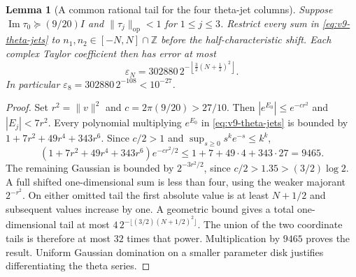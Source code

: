 \documentclass[11pt]{article}
\newtheorem{lemma}[lemma]{Lemma}
\theoremstyle{definition}
\theoremstyle{remark}
\newcommand{\Z}{\mathbb Z}
\newcommand{\op}{\mathrm{op}}
\begin{document}
\begin{lemma}[A common rational tail for the four theta-jet columns]
\label{lem:v9-jet-tail}
Suppose $\operatorname{Im}\tau_0\succeq(9/20)I$ and
$\|\tau_j\|_{\op}<1$ for $1\le j\le3$. Restrict every sum in
\cref{eq:v9-theta-jets} to $n_1,n_2\in[-N,N]\cap\Z$ before the
half-characteristic shift. Each complex Taylor coefficient then has error
at most
\begin{equation}
 \boxed{\varepsilon_N=
 302880\,2^{-\left\lfloor\frac32(N+\frac12)^2\right\rfloor}.}
 \label{eq:v9-theta-tail}
\end{equation}
In particular $\varepsilon_8=302880\,2^{-108}<10^{-27}$.
\end{lemma}
\begin{proof}
Set $r^2=\|v\|^2$ and $c=2\pi(9/20)>27/10$.
Then $|e^{E_0}|\le e^{-cr^2}$ and $|E_j|<7r^2$.
Every polynomial multiplying $e^{E_0}$ in \cref{eq:v9-theta-jets} is
bounded by $1+7r^2+49r^4+343r^6$. Since $c/2>1$ and
$\sup_{s\ge0}s^ke^{-s}\le k^k$,
\[
 (1+7r^2+49r^4+343r^6)e^{-cr^2/2}\le
 1+7+49\cdot4+343\cdot27=9465.
\]
The remaining Gaussian is bounded by $2^{-3r^2/2}$, since
$c/2>1.35>(3/2)\log2$. A full shifted one-dimensional sum is less than
four, using the weaker majorant $2^{-r^2}$. On either omitted tail the
first absolute value is at least $N+1/2$ and subsequent values increase
by one. A geometric bound gives a total one-dimensional tail at most
$4\,2^{-\lfloor(3/2)(N+1/2)^2\rfloor}$. The union of the two
coordinate tails is therefore at most $32$ times that power. Multiplication
by $9465$ proves the result. Uniform Gaussian domination on a smaller
parameter disk justifies differentiating the theta series.
\end{proof}
\end{document}
